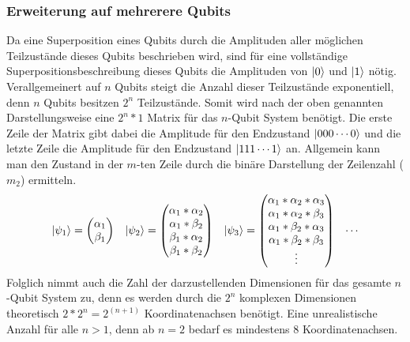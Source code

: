 \documentclass[12pt]{report}
\begin{document}
\subsubsection{Erweiterung auf mehrerere Qubits}			%
Da eine Superposition eines Qubits durch die Amplituden aller möglichen Teilzustände dieses Qubits beschrieben wird, sind für eine vollständige Superpositionsbeschreibung dieses Qubits die Amplituden von $\ket{0}$ und $\ket{1}$ nötig.
Verallgemeinert auf $n$ Qubits steigt die Anzahl dieser Teilzustände exponentiell, denn $n$ Qubits besitzen $2^n$ Teilzustände. Somit wird nach der oben genannten Darstellungsweise eine $2^n * 1$ Matrix für das $n$-Qubit System benötigt. Die erste Zeile der Matrix gibt dabei die Amplitude für den Endzustand $\ket{000\cdots0}$ und die letzte Zeile die Amplitude für den Endzustand $\ket{111\cdots1}$ an. Allgemein kann man den Zustand in der $m$-ten Zeile durch die binäre Darstellung der Zeilenzahl ($m_2$) ermitteln.
	\begin{align*}
	\ket{\psi_1} &= \begin{pmatrix} \alpha_1 \\ \beta_1 \end{pmatrix} &
	\ket{\psi_2} &= \begin{pmatrix} \alpha_1 * \alpha_2  \\ \alpha_1 * \beta_2 \\ \beta_1 * \alpha_2 \\ \beta_1 * \beta_2 \end{pmatrix} &
	\ket{\psi_3} &= \begin{pmatrix} \alpha_1 * \alpha_2 * \alpha_3  \\ \alpha_1 * \alpha_2 *\beta_3 \\ \alpha_1 * \beta_2 * \alpha_3 \\ \alpha_1 * \beta_2 * \beta_3 \\ \vdots \end{pmatrix} &	
	\cdots
	\end{align*}
Folglich nimmt auch die Zahl der darzustellenden Dimensionen für das gesamte $n$-Qubit System zu, denn es werden durch die $2^n$ komplexen Dimensionen theoretisch $2*2^n = 2^{(n+1)}$ Koordinatenachsen benötigt. Eine unrealistische Anzahl für alle $n>1$, denn ab $n=2$ bedarf es mindestens 8 Koordinatenachsen.
\end{document}
